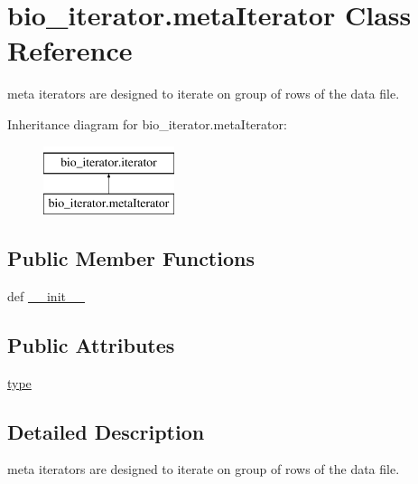 \hypertarget{classbio__iterator_1_1meta_iterator}{\section{bio\+\_\+iterator.\+meta\+Iterator Class Reference}
\label{classbio__iterator_1_1meta_iterator}
}


meta iterators are designed to iterate on group of rows of the data file.  


Inheritance diagram for bio\+\_\+iterator.\+meta\+Iterator\+:\begin{figure}[H]
\begin{center}
\leavevmode
\includegraphics[height=2.000000cm]{d9/db9/classbio__iterator_1_1meta_iterator}
\end{center}
\end{figure}
\subsection*{Public Member Functions}
\begin{DoxyCompactItemize}
\item 
def \hyperlink{classbio__iterator_1_1meta_iterator_af50b46aa10d29e207623885644f42e0d}{\+\_\+\+\_\+init\+\_\+\+\_\+}
\end{DoxyCompactItemize}
\subsection*{Public Attributes}
\begin{DoxyCompactItemize}
\item 
\hyperlink{classbio__iterator_1_1meta_iterator_acc36049ad5625b94dccbe176505cfaaa}{type}
\end{DoxyCompactItemize}


\subsection{Detailed Description}
meta iterators are designed to iterate on group of rows of the data file. 


